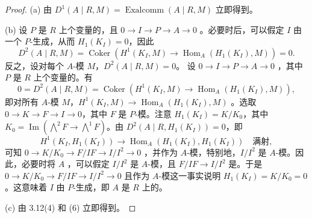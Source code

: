 \begin{proof}
(a) 由 $D^1(A\mid R,M)=\operatorname{Exalcomm}(A\mid R,M)$ 立即得到。

(b) 设 $P$ 是 $R$ 上个变量的，且 $0\to I\to P\to A\to0$ 。必要时后，可以假定 $I$ 由一个 $P$-生成，从而 $H_1(K_I)=0$，因此
\[D^2(A\mid R,M)=\operatorname{Coker}(H^1(K_I,M)\to\operatorname{Hom}_A(H_1(K_I),M))=0.\]
反之，设对每个 $A$-模 $M$，$D^2(A\mid R,M)=0$。
设 $0\to I\to P\to A\to0$ ，其中 $P$ 是 $R$ 上个变量的。有
\[0=D^2(A\mid R,M)=\operatorname{Coker}(H^1(K_I,M)\to\operatorname{Hom}_A(H_1(K_I),M)),\]
即对所有 $A$-模 $M$，$H^1(K_I,M)\to\operatorname{Hom}_A(H_1(K_I),M)$ 。选取 $0\to K\to F\to I\to0$，其中 $F$ 是 $P$-模。注意 $H_1(K_I)=K/K_0$，其中 $K_0=\operatorname{Im}(\bigwedge^2F\to\bigwedge^1F)$。由 $D^2(A\mid R,H_1(K_I))=0$，即
\[H^1(K_I,H_1(K_I))\longrightarrow\operatorname{Hom}_A(H_1(K_I),H_1(K_I))\quad\text{满射},\]
可知 $0\to K/K_0\to F/IF\to I/I^2\to0$ ，并作为 $A$-模，特别地，$I/I^2$ 是 $A$-模。因此，必要时将 $A$ ，可以假定 $I/I^2$ 是 $A$-模，且 $F/IF\to I/I^2$ 是。于是 $0\to K/K_0\to F/IF\to I/I^2\to0$ 且作为 $A$-模这一事实说明 $H_1(K_I)=K/K_0=0$。这意味着 $I$ 由 $P$-生成，即 $A$ 是 $R$ 上的。

(c) 由 3.12(4) 和 (6) 立即得到。


\end{proof}
